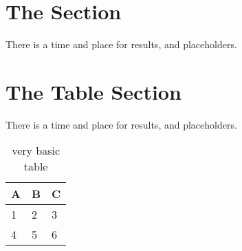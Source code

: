 \section{The Section}
There is a time and place for results, and placeholders.
\section{The Table Section}
There is a time and place for results, and placeholders.
\begin{table}[h]
\centering
\begin{tabular}{l | l | l}
A & B & C \\
\hline
1 & 2 & 3 \\
4 & 5 & 6
\end{tabular}
\caption{very basic table}
\label{tab:abc}
\end{table}

